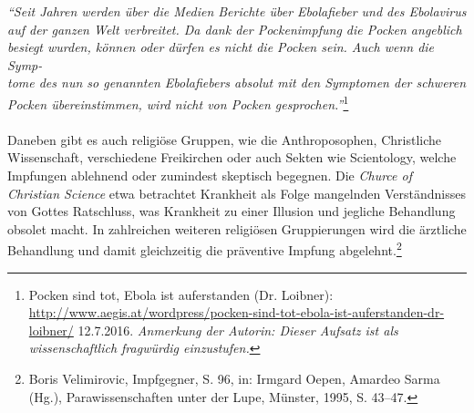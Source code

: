 \documentclass[
    a4paper,
    12pt,
    hyphens,
    chapterprefix=true,
    headheight=33pt,
    footheight=29pt,
    headings=optiontohead, %
]{scrartcl}
\begin{document}
\textit{"`Seit Jahren werden über die Medien Berichte über Ebolafieber und des Ebolavirus auf der ganzen Welt verbreitet. Da dank der Pockenimpfung die Pocken angeblich besiegt wurden, können oder dürfen es nicht die Pocken sein. Auch wenn die Symp-\\tome des nun so genannten Ebolafiebers absolut mit den Symptomen der schweren Pocken übereinstimmen, wird nicht von Pocken gesprochen."'}\footnote{Pocken sind tot, Ebola ist auferstanden (Dr. Loibner): \url{http://www.aegis.at/wordpress/pocken-sind-tot-ebola-ist-auferstanden-dr-loibner/} 12.7.2016. \textit{Anmerkung der Autorin: Dieser Aufsatz ist als wissenschaftlich fragwürdig einzustufen.}}\\
\\
Daneben gibt es auch religiöse Gruppen, wie die Anthroposophen, Christliche Wissenschaft, verschiedene Freikirchen oder auch Sekten wie Scientology, welche Impfungen ablehnend oder zumindest skeptisch begegnen. Die \textit{Churce of Christian Science} etwa betrachtet Krankheit als Folge mangelnden Verständnisses von Gottes Ratschluss, was Krankheit zu einer Illusion und jegliche Behandlung obsolet macht. In zahlreichen weiteren religiösen Gruppierungen wird die ärztliche Behandlung und damit gleichzeitig die präventive Impfung abgelehnt.\footnote{Boris Velimirovic, Impfgegner, S. 96, in: Irmgard Oepen, Amardeo Sarma (Hg.), Parawissenschaften unter der Lupe, Münster, 1995, S. 43--47.}
\end{document}
